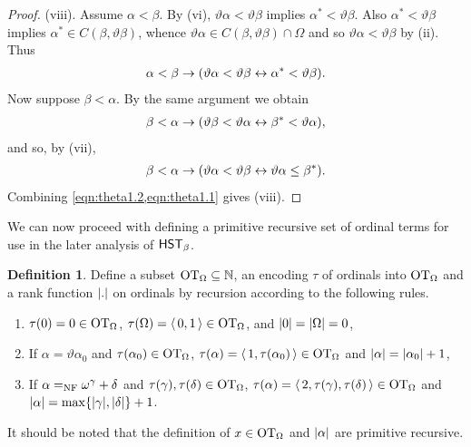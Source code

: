\documentclass[UKenglish,cleveref,DIV=12]{scrartcl}
\theoremstyle{definition}
\newtheorem{definition}[lemma]{Definition}
\theoremstyle{definition}
\begin{document}
\begin{proof}
(viii). Assume $\alpha<\beta$. By (vi), $\vartheta\alpha<\vartheta\beta$ implies $\alpha^*<\vartheta\beta$. Also $\alpha^*<\vartheta\beta$ implies $\alpha^*\in C(\beta,\vartheta\beta)$, whence $\vartheta\alpha\in C(\beta,\vartheta\beta)\cap \Omega$ and so $\vartheta\alpha<\vartheta\beta$ by (ii). Thus
\begin{align}\label{eqn:theta1.1}
 \alpha<\beta\rightarrow(\vartheta\alpha<\vartheta\beta \leftrightarrow \alpha^*<\vartheta\beta).
\end{align}
Now suppose $\beta<\alpha$. By the same argument we obtain
\begin{align*}
 \beta<\alpha \rightarrow(\vartheta\beta<\vartheta\alpha \leftrightarrow \beta^*<\vartheta\alpha),
\end{align*}
and so, by (vii),
\begin{align}\label{eqn:theta1.2}
 \beta<\alpha \rightarrow(\vartheta\alpha<\vartheta\beta \leftrightarrow \vartheta\alpha\le\beta^*).
\end{align}
Combining \cref{eqn:theta1.2,eqn:theta1.1} gives (viii).
%
\end{proof}
We can now proceed with defining a primitive recursive set of ordinal terms for
use in the later analysis of $\mathsf{HST}_\beta$.
\begin{definition} Define a subset $\mathrm{OT}_\Omega\subseteq\mathbb N$, an encoding $\tau$
of ordinals into $\mathrm{OT}_\Omega$ and a rank function $\lvert{.}\rvert$ on ordinals by
recursion according to the following rules.
\begin{enumerate}%
 \item $\tau(0)=0\in\mathrm{OT}_\Omega$, $\tau(\Omega)=\langle\,0,1\,\rangle\in\mathrm{OT}_\Omega$, and $\lvert{0}\rvert=\lvert{\Omega}\rvert=0$,
 \item If $\alpha=\vartheta\alpha_0$ and $\tau(\alpha_0)\in\mathrm{OT}_\Omega$, $\tau(\alpha)=\langle\,1,\tau(\alpha_0)\,\rangle\in\mathrm{OT}_\Omega$ and $\lvert{\alpha}\rvert=\lvert{\alpha_0}\rvert+1$,
 \item If $\alpha=_{\mathrm{NF}}\omega^\gamma+\delta$ and $\tau(\gamma),\tau(\delta)\in\mathrm{OT}_\Omega$, $\tau(\alpha)=\langle\,2,\tau(\gamma),\tau(\delta)\,\rangle\in\mathrm{OT}_\Omega$ and $\lvert{\alpha}\rvert=\max\{\lvert{\gamma}\rvert,\lvert{\delta}\rvert\}+1$.
\end{enumerate}
\end{definition}
It should be noted that the definition of $x\in\mathrm{OT}_\Omega$ and $\lvert{\alpha}\rvert$ are primitive recursive.
\end{document}
